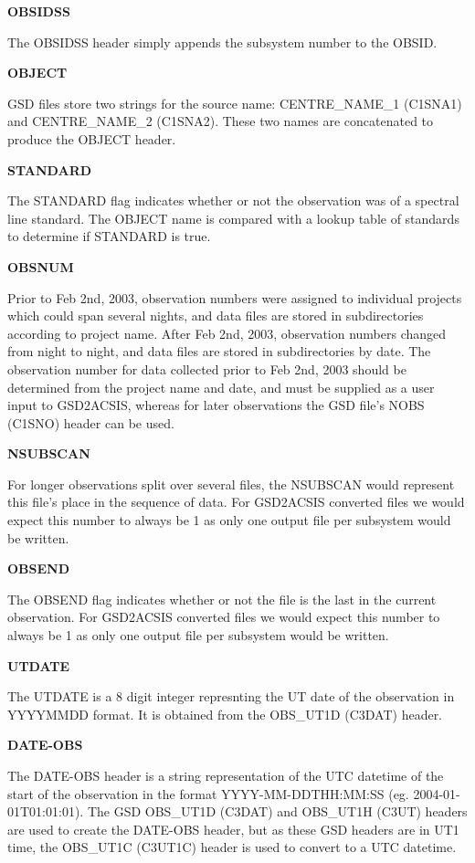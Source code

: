 \documentclass[twoside,11pt,nolof]{starlink}
\providecommand{\objectA}{CENTRE\_NAME\_1 (C1SNA1)}
\providecommand{\objectB}{CENTRE\_NAME\_2 (C1SNA2)}
\providecommand{\nObs}{NOBS (C1SNO)}
\providecommand{\obsUTd}{OBS\_UT1D (C3DAT)}
\providecommand{\obsUTh}{OBS\_UT1H (C3UT)}
\providecommand{\obsUTC}{OBS\_UT1C (C3UT1C)}
\begin{document}
\textbf{OBSIDSS}

The OBSIDSS header simply appends the subsystem number to the OBSID.

\textbf{OBJECT}

GSD files store two strings for the source name: \objectA{} and \objectB.  These two names are concatenated to produce the OBJECT header.

\textbf{STANDARD}

The STANDARD flag indicates whether or not the observation was of a spectral line standard.  The OBJECT name is compared with a lookup table of standards to determine if STANDARD is true.

\textbf{OBSNUM}

Prior to Feb 2nd, 2003, observation numbers were assigned to individual projects which could span several nights, and data files are stored in subdirectories according to project name.  After Feb 2nd, 2003, observation numbers changed from night to night, and data files are stored in subdirectories by date.  The observation number for data collected prior to Feb 2nd, 2003 should be determined from the project name and date, and must be supplied as a user input to GSD2ACSIS, whereas for later observations the GSD file's \nObs{} header can be used.

\textbf{NSUBSCAN}

For longer observations split over several files, the NSUBSCAN would represent this file's place in the sequence of data.  For GSD2ACSIS converted files we would expect this number to always be 1 as only one output file per subsystem would be written.

\textbf{OBSEND}

The OBSEND flag indicates whether or not the file is the last in the current observation.  For GSD2ACSIS converted files we would expect this number to always be 1 as only one output file per subsystem would be written.

\textbf{UTDATE}

The UTDATE is a 8 digit integer represnting the UT date of the observation in YYYYMMDD format.  It is obtained from the \obsUTd{} header.

\textbf{DATE-OBS}

The DATE-OBS header is a string representation of the UTC datetime of the start of the observation in the format YYYY-MM-DDTHH:MM:SS (eg. 2004-01-01T01:01:01).
The GSD \obsUTd{} and \obsUTh{} headers are used to create the DATE-OBS header, but as these GSD headers are in UT1 time, the \obsUTC{} header is used to convert to a UTC datetime.
\end{document}
